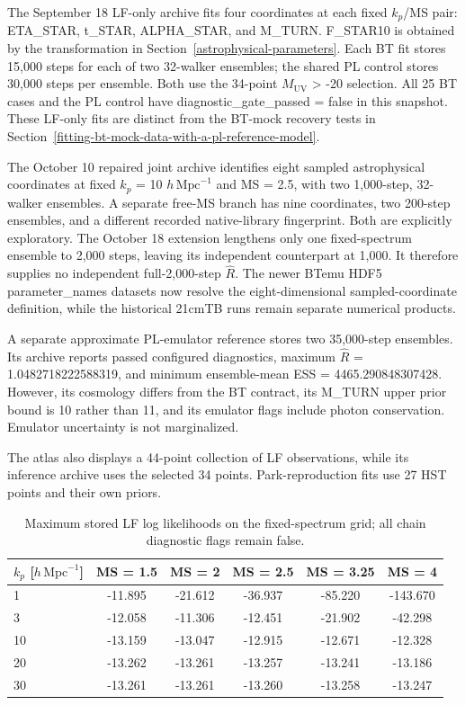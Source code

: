 The September 18 LF-only archive fits four coordinates at each fixed \ensuremath{k_p}/MS pair: ETA\_STAR, t\_STAR, ALPHA\_STAR, and M\_TURN. F\_STAR10 is obtained by the transformation in Section~\ref{astrophysical-parameters}. Each BT fit stores 15,000 steps for each of two 32-walker ensembles; the shared PL control stores 30,000 steps per ensemble. Both use the 34-point \ensuremath{M_{\mathrm{UV}}} \textgreater{} -20 selection. All 25 BT cases and the PL control have diagnostic\_gate\_passed = false in this snapshot. These LF-only fits are distinct from the BT-mock recovery tests in Section~\ref{fitting-bt-mock-data-with-a-pl-reference-model}.

The October 10 repaired joint archive identifies eight sampled astrophysical coordinates at fixed \ensuremath{k_p} = 10 $h\,\mathrm{Mpc}^{-1}$ and MS = 2.5, with two 1,000-step, 32-walker ensembles. A separate free-MS branch has nine coordinates, two 200-step ensembles, and a different recorded native-library fingerprint. Both are explicitly exploratory. The October 18 extension lengthens only one fixed-spectrum ensemble to 2,000 steps, leaving its independent counterpart at 1,000. It therefore supplies no independent full-2,000-step \(\widehat R\). The newer BTemu HDF5 parameter\_names datasets now resolve the eight-dimensional sampled-coordinate definition, while the historical 21cmTB runs remain separate numerical products.

A separate approximate PL-emulator reference stores two 35,000-step ensembles. Its archive reports passed configured diagnostics, maximum \(\widehat R\) = 1.0482718222588319, and minimum ensemble-mean ESS = 4465.290848307428. However, its cosmology differs from the BT contract, its M\_TURN upper prior bound is 10 rather than 11, and its emulator flags include photon conservation. Emulator uncertainty is not marginalized.

The atlas also displays a 44-point collection of LF observations, while its inference archive uses the selected 34 points. Park-reproduction fits use 27 HST points and their own priors.

\begin{table}[t]
\caption{Maximum stored LF log likelihoods on the fixed-spectrum grid; all chain diagnostic flags remain false.}
\label{tab:lf-values}
\centering\small
\begin{tabular}{lccccc}
\toprule
\ensuremath{k_p} {[}$h\,\mathrm{Mpc}^{-1}${]} & MS = 1.5 & MS = 2 & MS = 2.5 & MS = 3.25 & MS = 4 \\
\midrule
1 & -11.895 & -21.612 & -36.937 & -85.220 & -143.670 \\
3 & -12.058 & -11.306 & -12.451 & -21.902 & -42.298 \\
10 & -13.159 & -13.047 & -12.915 & -12.671 & -12.328 \\
20 & -13.262 & -13.261 & -13.257 & -13.241 & -13.186 \\
30 & -13.261 & -13.261 & -13.260 & -13.258 & -13.247 \\
\bottomrule
\end{tabular}
\end{table}

